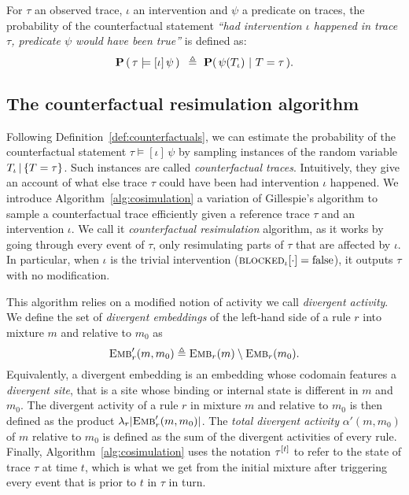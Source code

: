 \begin{definition}\label{def:counterfactuals}
  For $\tau$ an observed trace, $\iota$ an intervention and $\psi$ a
  predicate on traces, the probability of the counterfactual statement
  \textit{``had intervention $\iota$ happened in trace $\tau$,
    predicate $\psi$ would have been true''} is defined as:
  \[ \mathbf{P}\left( \,\tau \models [\iota] \, \psi \,\right){} \ \triangleq \
    \mathbf{P}(\, \psi({T_\iota}{}) \ |\ T = \tau\,). \]
\end{definition}

\subsection{The counterfactual resimulation algorithm}

Following Definition~\ref{def:counterfactuals}, we can estimate the
probability of the counterfactual statement
$\tau \models [\iota] \, \psi$ by sampling instances of the random
variable ${T_\iota\,|\,\{T=\tau\}}{}$. Such instances are called \emph{counterfactual
  traces}. Intuitively, they give an account of what else trace
$\tau$ could have been had intervention $\iota$ happened.  We
introduce Algorithm~\ref{alg:cosimulation} a variation of Gillespie's
algorithm to sample a counterfactual trace efficiently given a
reference trace $\tau$ and an intervention $\iota$.  We call it
\emph{counterfactual resimulation} algorithm, as it works by going
through every event of $\tau$, only resimulating parts of $\tau$ that are
affected by $\iota$. In particular, when $\iota$ is the trivial
intervention (${\textsc{blocked}}_{\iota}[\cdot] = \text{false}$), it outputs
$\tau$ with no modification.

This algorithm relies on a modified notion of activity we call
\emph{divergent activity}. We define the set of \emph{divergent
  embeddings} of the left-hand side of a rule $r$ into mixture $m$
and relative to $m_0$ as
\[{\textsc{Emb}}'_{r}(m, m_0) \triangleq {\textsc{Emb}}_{r}(m) \setminus {\textsc{Emb}}_{r}(m_0).\]
Equivalently, a divergent embedding is an embedding whose codomain
features a \emph{divergent site}, that is a site whose binding or
internal state is different in $m$ and $m_0$. The {divergent activity}
of a rule $r$ in mixture $m$ and relative to $m_0$ is then defined as
the product $\lambda_r|{\textsc{Emb}}'_{r}(m, m_0)|$. The \emph{total divergent
  activity} $\alpha'(m, m_0)$ of $m$ relative to $m_0$ is defined as
the sum of the divergent activities of every rule. Finally,
Algorithm~\ref{alg:cosimulation} uses the notation $\tau^{[t]}$
to refer to the state of trace $\tau$ at time $t$, which is what we
get from the initial mixture after triggering every event that is
prior to $t$ in $\tau$ in turn.

